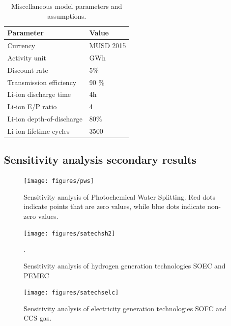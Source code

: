 \begin{table}[H]
	\caption{Miscellaneous model parameters and assumptions.}
	\vspace{0.1in}
	\begin{tabularx}{\textwidth}{p{} p{}}
		\hline
\textbf{Parameter} & \textbf{Value} \\
\hline
Currency & MUSD 2015 \\
Activity unit & GWh\\
Discount rate & 5\% \\
Transmission efficiency & 90 \% \\
Li-ion discharge time \cite{mongird_energy_2019} & 4h \\
Li-ion E/P ratio \cite{mongird_energy_2019} & 4  \\
Li-ion depth-of-discharge \cite{mongird_energy_2019} & 80\% \\
Li-ion lifetime cycles \cite{mongird_energy_2019} & 3500  \\
\hline 
	\end{tabularx}
\label{misc-assump}
\end{table}
 
\pagebreak 
 
\subsection{Sensitivity analysis secondary results}

\begin{figure}[H] 
\centering
\hspace*{-1cm}
\texttt{[image: figures/pws]}
\caption{Sensitivity analysis of Photochemical Water Splitting. Red dots indicate points that are zero values, while blue dots indicate non-zero values.}
\label{pws}
\end{figure}

\begin{figure}[H] 
\centering
\texttt{[image: figures/satechsh2]}
\caption{Sensitivity analysis of hydrogen generation technologies \gls{SOEC} and \gls{PEMEC}}.
\label{satechs-h2}
\end{figure}

\begin{figure}[H] 
\centering
\texttt{[image: figures/satechselc]}
\caption{Sensitivity analysis of electricity generation technologies \gls{SOFC} and \gls{CCS} gas.}
\label{satechs-elc}
\end{figure}


